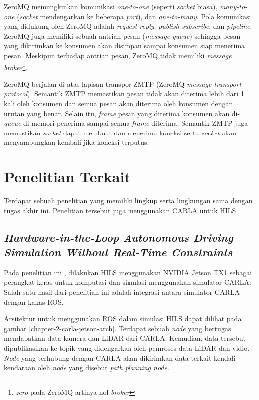 ZeroMQ memungkinkan komunikasi \textit{one-to-one} (seperti \textit{socket}
biasa), \textit{many-to-one} (\textit{socket} mendengarkan ke beberapa
\textit{port}), dan \textit{one-to-many}. Pola komunikasi yang didukung oleh
ZeroMQ adalah \textit{request-reply}, \textit{publish-subscribe}, dan
\textit{pipeline}. ZeroMQ juga memiliki sebuah antrian pesan (\textit{message
    queue}) sehingga pesan yang dikirimkan ke konsumen akan disimpan
sampai konsumen siap menerima pesan. Meskipun terhadap antrian pesan, ZeroMQ
tidak memiliki \textit{message broker}\footnote{\textit{zero} pada ZeroMQ
    artinya nol \textit{broker}}.

ZeroMQ berjalan di atas lapisan transpor ZMTP (ZeroMQ \textit{message transport
    protocol}). Semantik ZMTP memastikan pesan tidak akan diterima lebih dari 1 kali
oleh konsumen dan semua pesan akan diterima oleh konsumen dengan urutan yang
benar. Selain itu, \textit{frame} pesan yang diterima konsumen akan
di-\textit{queue} di memori penerima sampai semua \textit{frame} diterima.
Semantik ZMTP juga memastikan \textit{socket} dapat membuat dan menerima koneksi
serta \textit{socket} akan menyambungkan kembali jika koneksi terputus.

\section{Penelitian Terkait}

Terdapat sebuah penelitian yang memiliki lingkup serta lingkungan sama dengan
tugas akhir ini. Penelitian tersebut juga menggunakan CARLA untuk HILS.

\subsection{\textit{Hardware-in-the-Loop Autonomous Driving Simulation Without
        Real-Time Constraints}}

Pada penelitian ini \parencite{brogle_CarlaHILS}, dilakukan HILS menggunakan
NVIDIA Jetson TX1 sebagai perangkat keras untuk komputasi dan simulasi
menggunakan simulator CARLA. Salah satu hasil dari penelitian ini adalah
integrasi antara simulator CARLA dengan kakas ROS.

Arsitektur untuk menggunakan ROS dalam simulasi HILS dapat dilihat pada gambar
\ref{chapter-2-carla-jetson-arch}. Terdapat sebuah \textit{node}  yang
bertugas mendapatkan data kamera dan LiDAR dari CARLA. Kemudian, data tersebut
dipublikasikan ke topik yang didengarkan oleh pemroses data LiDAR dan vidio.
\textit{Node} yang terhubung dengan CARLA akan dikirimkan data terkait kendali
kendaraan oleh \textit{node} yang disebut \textit{path planning node}.

